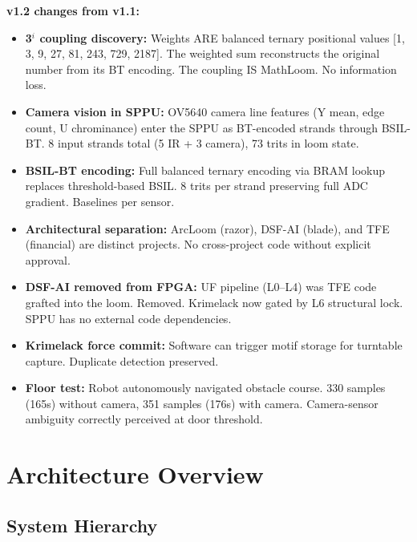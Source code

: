 \documentclass[11pt, a4paper]{article}
\begin{document}
\textbf{v1.2 changes from v1.1:}
\begin{itemize}[nosep]
  \item \textbf{3$^i$ coupling discovery:} Weights ARE balanced ternary
        positional values [1, 3, 9, 27, 81, 243, 729, 2187].
        The weighted sum reconstructs the original number from its
        BT encoding. The coupling IS MathLoom. No information loss.
  \item \textbf{Camera vision in SPPU:} OV5640 camera line features
        (Y mean, edge count, U chrominance) enter the SPPU as
        BT-encoded strands through BSIL-BT. 8 input strands total
        (5 IR + 3 camera), 73 trits in loom state.
  \item \textbf{BSIL-BT encoding:} Full balanced ternary encoding via
        BRAM lookup replaces threshold-based BSIL. 8 trits per strand
        preserving full ADC gradient. Baselines per sensor.
  \item \textbf{Architectural separation:} ArcLoom (razor), DSF-AI (blade),
        and TFE (financial) are distinct projects. No cross-project
        code without explicit approval.
  \item \textbf{DSF-AI removed from FPGA:} UF pipeline (L0--L4) was
        TFE code grafted into the loom. Removed. Krimelack now gated
        by L6 structural lock. SPPU has no external code dependencies.
  \item \textbf{Krimelack force commit:} Software can trigger motif
        storage for turntable capture. Duplicate detection preserved.
  \item \textbf{Floor test:} Robot autonomously navigated obstacle course.
        330 samples (165s) without camera, 351 samples (176s) with camera.
        Camera-sensor ambiguity correctly perceived at door threshold.
\end{itemize}

\section{Architecture Overview}

\subsection{System Hierarchy}
\end{document}
